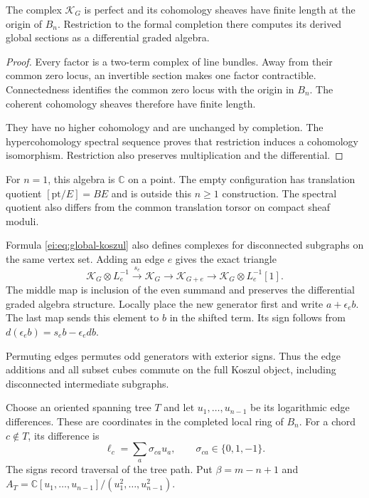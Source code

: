 \begin{lemma}\label{ei:lem:completion}
The complex $\mathscr K_G$ is perfect and its cohomology sheaves
have finite length at the origin of $B_n$.
Restriction to the formal completion there computes its derived
global sections as a differential graded algebra.
\end{lemma}

\begin{proof}
Every factor is a two-term complex of line bundles.
Away from their common zero locus, an invertible section makes one
factor contractible. Connectedness identifies the common zero locus
with the origin in $B_n$.
The coherent cohomology sheaves therefore have finite length.

They have no higher cohomology and are unchanged by completion.
The hypercohomology spectral sequence proves that restriction
induces a cohomology isomorphism. Restriction also preserves
multiplication and the differential.
\end{proof}

For $n=1$, this algebra is $\mathbb C$ on a point.
The empty configuration has translation quotient
$[\mathrm{pt}/E]=BE$ and is outside this $n\geq1$ construction.
The spectral quotient also differs from the common translation
torsor on compact sheaf moduli.

Formula \eqref{ei:eq:global-koszul} also defines complexes for
disconnected subgraphs on the same vertex set.
Adding an edge $e$ gives the exact triangle
\begin{equation}\label{ei:eq:edge-triangle}
 \mathscr K_G\otimes L_e^{-1}\xrightarrow{s_e}\mathscr K_G
 \longrightarrow\mathscr K_{G+e}
 \longrightarrow\mathscr K_G\otimes L_e^{-1}[1].
\end{equation}
The middle map is inclusion of the even summand and preserves the
differential graded algebra structure. Locally place the new
generator first and write $a+\epsilon_e b$.
The last map sends this element to $b$ in the shifted term.
Its sign follows from
$d(\epsilon_e b)=s_e b-\epsilon_e db$.

Permuting edges permutes odd generators with exterior signs.
Thus the edge additions and all subset cubes commute on the full
Koszul object, including disconnected intermediate subgraphs.

Choose an oriented spanning tree $T$ and let
$u_1,\ldots,u_{n-1}$ be its logarithmic edge differences.
These are coordinates in the completed local ring of $B_n$.
For a chord $c\notin T$, its difference is
\[
 \ell_c=\sum_a\sigma_{ca}u_a,\qquad
 \sigma_{ca}\in\{0,1,-1\}.
\]
The signs record traversal of the tree path.
Put $\beta=m-n+1$ and
$A_T=\mathbb C[u_1,\ldots,u_{n-1}]/(u_1^2,\ldots,u_{n-1}^2)$.

